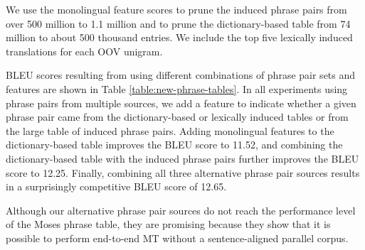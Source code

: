 \documentclass[11pt]{article}
\newcommand{\mnote}[1]{\marginpar{%
  \vskip-\baselineskip
  \raggedright\footnotesize
  \itshape\hrule\smallskip\tiny{#1}\par\smallskip\hrule}}
\newcommand{\mtodo}[1]{\mnote{\textcolor{red}{#1}}}
\begin{document}
We use the monolingual feature scores to prune the induced phrase pairs from over 500 million to 1.1 million and to prune the dictionary-based table from 74 million to about 500 thousand entries. We include the top five lexically induced translations for each OOV unigram.

BLEU scores resulting from using different combinations of phrase pair sets and features are shown in Table \ref{table:new-phrase-tables}. In all experiments using phrase pairs from multiple sources, we add a feature to indicate whether a given phrase pair came from the dictionary-based or lexically induced tables or from the large table of induced phrase pairs.
Adding monolingual features to the dictionary-based table improves the BLEU score to 
11.52, and combining the dictionary-based table with the induced phrase pairs further improves the BLEU score to 12.25. Finally, combining all three alternative phrase pair sources results in a surprisingly competitive BLEU score of 12.65\mtodo{get final score with tuning, and with other lower frequency terms}. 

Although our alternative phrase pair sources do not reach the performance level of the Moses phrase table, they are promising because they show that it is possible to perform end-to-end MT without a sentence-aligned parallel corpus. %

\end{document}
